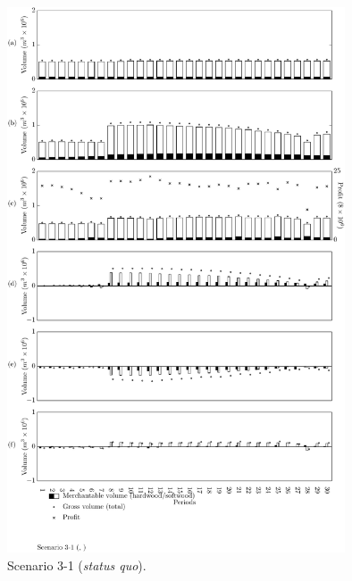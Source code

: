 \begin{figure}[h]
  \centering
  \includegraphics[width=10cm]{images/appendix/s3-1}
  \caption{Scenario 3-1 (\emph{status quo}).}
  \label{fig:s3-1}
\end{figure}

